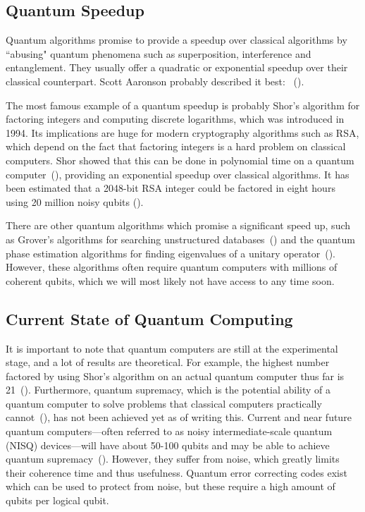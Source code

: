 \documentclass[a4paper,10pt]{article}
\begin{document}
\subsection{Quantum Speedup}
Quantum algorithms promise to provide a speedup over classical algorithms by ``abusing" quantum phenomena such as superposition, interference and entanglement.
They usually offer a quadratic or exponential speedup over their classical counterpart.
Scott Aaronson probably described it best:
~(\cite{scott-aaronson-qc}).

The most famous example of a quantum speedup is probably Shor's algorithm for factoring integers and computing discrete logarithms, which was introduced in 1994.
Its implications are huge for modern cryptography algorithms such as RSA, which depend on the fact that factoring integers is a hard problem on classical computers.
Shor showed that this can be done in polynomial time on a quantum computer~(\cite{shor-factoring}), providing an exponential speedup over classical algorithms. 
It has been estimated that a 2048-bit RSA integer could be factored in eight hours using 20 million noisy qubits (\cite{shor-20mil}).

There are other quantum algorithms which promise a significant speed up, such as Grover's algorithms for searching unstructured databases~(\cite{grover-search}) and the quantum phase estimation algorithms for finding eigenvalues of a unitary operator~(\cite{nielsen-chuang}).
However, these algorithms often require quantum computers with millions of coherent qubits, which we will most likely not have access to any time soon.

\subsection{Current State of Quantum Computing}
It is important to note that quantum computers are still at the experimental stage, and a lot of results are theoretical.
For example, the highest number factored by using Shor's algorithm on an actual quantum computer thus far is 21~(\cite{shor-21}).
Furthermore, quantum supremacy, which is the potential ability of a quantum computer to solve problems that classical computers practically cannot~(\cite{preskill-qc}), has not been achieved yet as of writing this.
Current and near future quantum computers---often referred to as noisy intermediate-scale quantum (NISQ) devices---will have about 50-100 qubits and may be able to achieve quantum supremacy~(\cite{preskill-nisq}).
However, they suffer from noise, which greatly limits their coherence time and thus usefulness.
Quantum error correcting codes exist which can be used to protect from noise, but these require a high amount of qubits per logical qubit.
\end{document}
